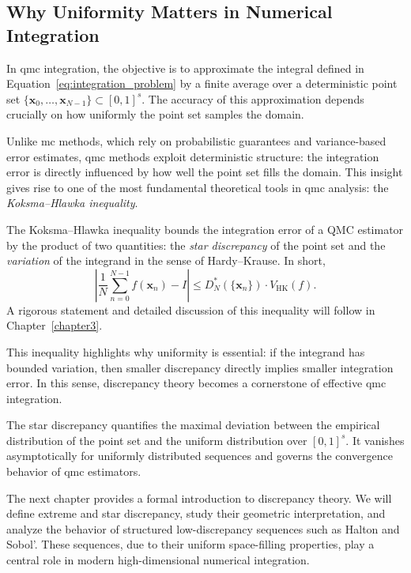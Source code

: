 \subsection{Why Uniformity Matters in Numerical Integration}

In \ac{qmc} integration, the objective is to approximate the integral defined in
Equation~\eqref{eq:integration_problem} by a finite average over a deterministic
point set $\{\boldsymbol{x}_0, \dots, \boldsymbol{x}_{N-1}\} \subset [0,1]^s$.
The accuracy of this approximation depends crucially on how uniformly the point
set samples the domain.

Unlike \ac{mc} methods, which rely on probabilistic guarantees and
variance-based error estimates, \ac{qmc} methods exploit deterministic
structure: the integration error is directly influenced by how well the point
set fills the domain. This insight gives rise to one of the most fundamental
theoretical tools in \ac{qmc} analysis: the \emph{Koksma--Hlawka inequality}.

\begin{remark}
The Koksma--Hlawka inequality bounds the integration error of a QMC estimator by
the product of two quantities: the \emph{star discrepancy} of the point set and
the \emph{variation} of the integrand in the sense of Hardy--Krause. In
short,
\begin{equation*}
    \left| \frac{1}{N} \sum_{n=0}^{N-1} f(\boldsymbol{x}_n) - I \right| 
    \leq D_N^*(\{\boldsymbol{x}_n\}) \cdot V_{\mathrm{HK}}(f).
\end{equation*}
A rigorous statement and detailed discussion of this inequality will follow in
Chapter~\ref{chapter3}.
\end{remark}

This inequality highlights why uniformity is essential: if the integrand has
bounded variation, then smaller discrepancy directly implies smaller integration
error. In this sense, discrepancy theory becomes a cornerstone of effective
\ac{qmc} integration.

\begin{remark}
The star discrepancy quantifies the maximal deviation between the empirical
distribution of the point set and the uniform distribution over $[0,1]^s$. It
vanishes asymptotically for uniformly distributed sequences and governs the
convergence behavior of \ac{qmc} estimators.
\end{remark}

The next chapter provides a formal introduction to discrepancy theory. We will
define extreme and star discrepancy, study their geometric interpretation, and
analyze the behavior of structured low-discrepancy sequences such as Halton and
Sobol'. These sequences, due to their uniform space-filling properties, play a
central role in modern high-dimensional numerical integration.
